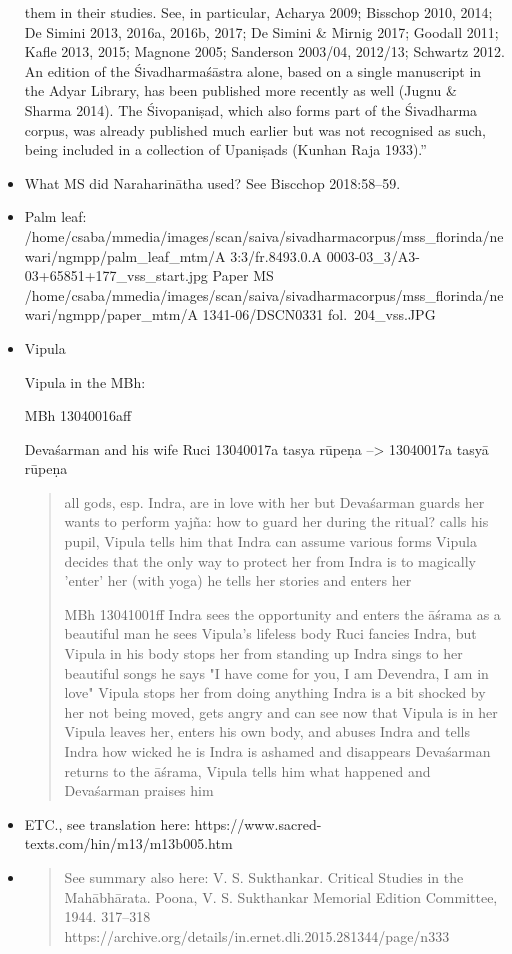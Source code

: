 \documentclass[11pt]{book}
\begin{document}
\begin{itemize}
  them in their studies. See, in particular, Acharya 2009; Bisschop
  2010, 2014; De Simini 2013, 2016a, 2016b, 2017; De Simini \& Mirnig
  2017; Goodall 2011; Kafle 2013, 2015; Magnone 2005; Sanderson 2003/04,
  2012/13; Schwartz 2012. An edition of the Śivadharmaśāstra alone,
  based on a single manuscript in the Adyar Library, has been published
  more recently as well (Jugnu \& Sharma 2014). The Śivopaniṣad, which
  also forms part of the Śivadharma corpus, was already published much
  earlier but was not recognised as such, being included in a collection
  of Upaniṣads (Kunhan Raja 1933).''
\item
  What MS did Naraharinātha used? See Biscchop 2018:58--59.
\item
  Palm leaf:
  /home/csaba/mmedia/images/scan/saiva/sivadharmacorpus/mss\_florinda/newari/ngmpp/palm\_leaf\_mtm/A
  3:3/fr.8493.0.A 0003-03\_3/A3-03+65851+177\_vss\_start.jpg Paper MS
  /home/csaba/mmedia/images/scan/saiva/sivadharmacorpus/mss\_florinda/newari/ngmpp/paper\_mtm/A
  1341-06/DSCN0331 fol.~204\_vss.JPG
\item
  Vipula

  Vipula in the MBh:

  MBh 13040016aff

  Devaśarman and his wife Ruci 13040017a tasya rūpeṇa --\textgreater{}
  13040017a tasyā rūpeṇa

\begin{quote}
  all gods, esp. Indra, are in love with her but Devaśarman guards her
  wants to perform yajña: how to guard her during the ritual?  calls his
  pupil, Vipula tells him that Indra can assume various forms Vipula
  decides that the only way to protect her from Indra is to magically
  'enter' her (with yoga) he tells her stories and enters her 

  MBh 13041001ff Indra sees the opportunity and enters the āśrama as a
  beautiful man he sees Vipula's lifeless body Ruci fancies Indra, but
  Vipula in his body stops her from standing up Indra sings to her
  beautiful songs he says "I have come for you, I am Devendra, I am in
  love" Vipula stops her from doing anything Indra is a bit shocked by
  her not being moved, gets angry and can see now that Vipula is in her
  Vipula leaves her, enters his own body, and abuses Indra and tells
  Indra how wicked he is Indra is ashamed and disappears Devaśarman
  returns to the āśrama, Vipula tells him what happened and Devaśarman
  praises him
\end{quote}
\item
  ETC., see translation here:
  https://www.sacred-texts.com/hin/m13/m13b005.htm
\item
\begin{quote}
  See summary also here:
 V. S. Sukthankar. Critical Studies in the Mahābhārata.  Poona, V. S.
 Sukthankar Memorial Edition Committee, 1944. 317--318
 https://archive.org/details/in.ernet.dli.2015.281344/page/n333
\end{quote}
\end{itemize}
\end{document}
